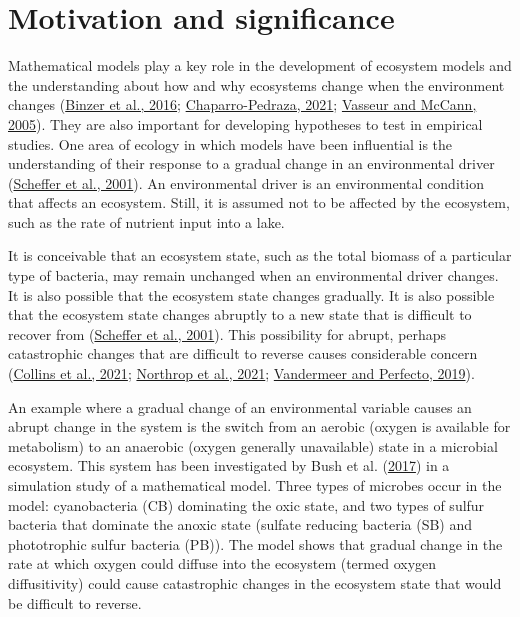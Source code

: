 \documentclass[
]{article}
\begin{document}
\hypertarget{motivation-and-significance}{%
\section{Motivation and significance}\label{motivation-and-significance}}

Mathematical models play a key role in the development of ecosystem models and the understanding about how and why ecosystems change when the environment changes (\protect\hyperlink{ref-Binzer2016a}{Binzer et al., 2016}; \protect\hyperlink{ref-Chaparro-Pedraza2021}{Chaparro-Pedraza, 2021}; \protect\hyperlink{ref-Vasseur2005}{Vasseur and McCann, 2005}). They are also important for developing hypotheses to test in empirical studies. One area of ecology in which models have been influential is the understanding of their response to a gradual change in an environmental driver (\protect\hyperlink{ref-Scheffer2001}{Scheffer et al., 2001}). An environmental driver is an environmental condition that affects an ecosystem. Still, it is assumed not to be affected by the ecosystem, such as the rate of nutrient input into a lake.

It is conceivable that an ecosystem state, such as the total biomass of a particular type of bacteria, may remain unchanged when an environmental driver changes. It is also possible that the ecosystem state changes gradually. It is also possible that the ecosystem state changes abruptly to a new state that is difficult to recover from (\protect\hyperlink{ref-Scheffer2001}{Scheffer et al., 2001}). This possibility for abrupt, perhaps catastrophic changes that are difficult to reverse causes considerable concern (\protect\hyperlink{ref-Collins2021}{Collins et al., 2021}; \protect\hyperlink{ref-Northrop2021}{Northrop et al., 2021}; \protect\hyperlink{ref-Vandermeer2019}{Vandermeer and Perfecto, 2019}).

An example where a gradual change of an environmental variable causes an abrupt change in the system is the switch from an aerobic (oxygen is available for metabolism) to an anaerobic (oxygen generally unavailable) state in a microbial ecosystem. This system has been investigated by Bush et al. (\protect\hyperlink{ref-Bush2017}{2017}) in a simulation study of a mathematical model. Three types of microbes occur in the model: cyanobacteria (CB) dominating the oxic state, and two types of sulfur bacteria that dominate the anoxic state (sulfate reducing bacteria (SB) and phototrophic sulfur bacteria (PB)). The model shows that gradual change in the rate at which oxygen could diffuse into the ecosystem (termed oxygen diffusitivity) could cause catastrophic changes in the ecosystem state that would be difficult to reverse.
\end{document}
